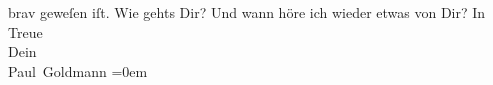 \begin{ledgroupsized}[t]{13cm}
               brav geweſen iſt.\pend
           \pstart
           Wie gehts Dir? Und wann höre ich wieder etwas von Dir?\pend
           \pstart
           In Treue{\\[\baselineskip]}Dein{\\[\baselineskip]}\spacefill\mbox{Paul Goldmann}\pend
           \leftskip=0em{}\endnumbering{}\end{ledgroupsized}  \newcommand{\dateiname}{L02624}\newcommand{\titel}{Paul Goldmann an Arthur Schnitzler, 3. 11. 1894}\newcommand{\editorInnen}{Martin Anton Müller und Laura Untner}
      